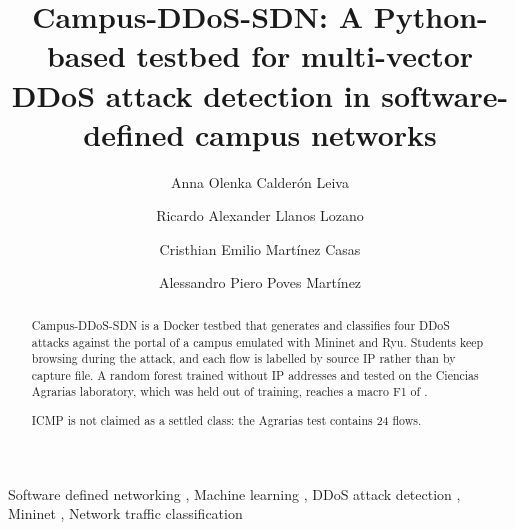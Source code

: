 \documentclass[a4paper,fleqn]{cas-dc}
\begin{document}
\let\WriteBookmarks\relax
\def\floatpagepagefraction{1}
\def\textpagefraction{.001}


\title[mode=title]{Campus-DDoS-SDN: A Python-based testbed for
multi-vector DDoS attack detection in software-defined campus networks}

\author[1]{Anna Olenka Calder\'on Leiva}

\author[1]{Ricardo Alexander Llanos Lozano}

\author[1]{Cristhian Emilio Mart\'inez Casas}
\cormark[1]

\author[1]{Alessandro Piero Poves Mart\'inez}





\begin{abstract}
Campus-DDoS-SDN is a Docker testbed that generates and classifies
four DDoS attacks against the portal of a campus emulated with
Mininet and Ryu. Students keep browsing during the attack, and each
flow is labelled by source IP rather than by capture file. A random
forest trained without IP addresses and tested on the Ciencias
Agrarias laboratory, which was held out of training, reaches a macro
F1 of \Fmacro.

ICMP is not claimed as a settled class: the Agrarias test contains
24 flows.
\end{abstract}

\begin{keywords}
Software defined networking \sep
Machine learning \sep
DDoS attack detection \sep
Mininet \sep
Network traffic classification
\end{keywords}

\maketitle
\end{document}
